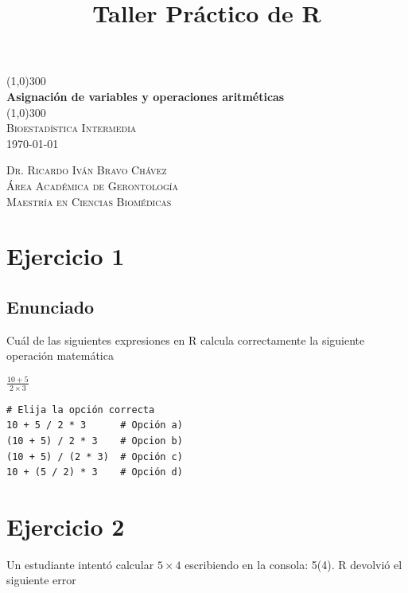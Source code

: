 \documentclass{article}
\title{Taller Práctico de R}
\begin{document}
\begin{titlepage}
    \begin{center}
        \line(1,0){300}\\[0.65cm]
        \huge{\bfseries Asignación de variables y operaciones aritméticas}\\[0.3cm]
        \line(1,0){300}\\[0.5cm]
        \textsc{\Large Bioestadística Intermedia}\\[0.5cm]
        \textsc{\LARGE \today}\\[4.5cm]     
    \end{center}
    
    \begin{flushright}
        \textsc{\Large Dr. Ricardo Iván Bravo Chávez}\\[0.3cm]
        \textsc{\Large Área Académica de Gerontología}\\[0.3cm]
        \textsc{\Large Maestría en Ciencias Biomédicas}\\[0.5cm]
    \end{flushright}
\end{titlepage}

\section*{Ejercicio 1}

\subsection*{Enunciado}
\textquestiondown Cuál de las siguientes expresiones en R calcula 
correctamente la siguiente operación matemática 
\begin{center}
    \large
$\frac{10+5}{2\times3}$
\end{center}

\begin{verbatim}
# Elija la opción correcta
10 + 5 / 2 * 3      # Opción a)
(10 + 5) / 2 * 3    # Opcion b)
(10 + 5) / (2 * 3)  # Opción c)
10 + (5 / 2) * 3    # Opción d)
\end{verbatim}

\section*{Ejercicio 2}
Un estudiante intentó calcular $5 \times 4$ escribiendo en la consola: 5(4). 
R devolvió el siguiente error 
\end{document}
